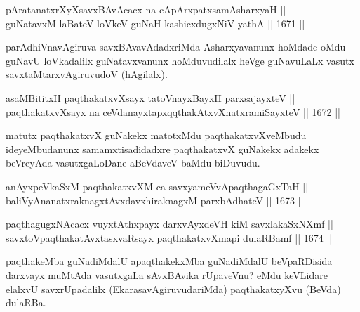 
\begin{shl}
pAratanatxrXyXsavxBAvAcacx na cApArxpatxsamAsharxyaH || \\
guNatavxM laBateV loVkeV guNaH kashicxdugxNiV yathA \hfill || 1671 ||  
\end{shl}

\begin{artha}
parAdhiVnavAgiruva savxBAvavAdadxriMda Asharxyavanunx hoMdade oMdu guNavU loVkadalilx guNatavxvanunx hoMduvudilalx heVge guNavuLaLx vasutx savxtaMtarxvAgiruvudoV (hAgilalx).
\end{artha}

\begin{shl}
asaMBititxH paqthakatxvXsayx tatoV\s nayxBayxH parxsajayxteV ||  \\
paqthakatxvXsayx na ceVdanayxtapxqqthakAtxvXnatxramiSayxteV \hfill || 1672 ||  
\end{shl}

\begin{artha}
matutx paqthakatxvX guNakekx matotxMdu paqthakatxvXveMbudu ideyeMbudanunx samamxtisadidadxre paqthakatxvX guNakekx adakekx beVreyAda vasutxgaLoDane aBeVdaveV baMdu biDuvudu.
\end{artha}

\begin{shl}
anAyxpeVkaSxM paqthakatxvXM ca savxyameVvApaqthagaGxTaH || \\
baliVyAnanatxraknagxtAvxdavxhiraknagxM parxbAdhateV \hfill || 1673 ||  
\end{shl}



\begin{shl}
paqthagugxNAcacx vuyxtAthxpayx darxvAyxdeVH kiM savxlakaSxNXmf ||  \\
savxtoV\s paqthakatAvxtasxvaRsayx paqthakatxvXmapi dulaRBamf \hfill || 1674 ||  
\end{shl}

\begin{artha}
paqthakeMba guNadiMdalU apaqthakekxMba guNadiMdalU beVpaRDisida darxvayx muMtAda vasutxgaLa sAvxBAvika rUpaveVnu? eMdu keVLidare elalxvU savxrUpadalilx (EkarasavAgiruvudariMda) paqthakatxyXvu (BeVda) dulaRBa.
\end{artha}

